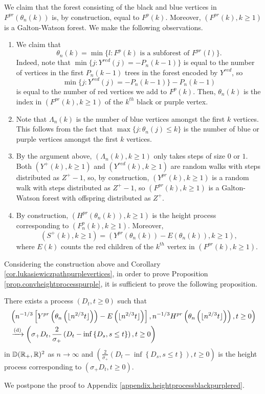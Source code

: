We claim that the forest consisting of the black and blue vertices in $F^{pr}(\theta_n(k))$ is, by construction, equal to $F^{p}(k)$. Moreover, $(F^{pr}(k),k\geq 1)$ is a Galton-Watson forest. We make the following observations.
\begin{enumerate}
    \item We claim that $$\theta_n(k)=\min\{l: F^p(k)\text{ is a subforest of }F^{pr}(l)\}.$$ Indeed, note that $\min\{j: Y^{red}(j)=-P_n(k-1)\}$ is equal to the number of vertices in the first $P_n(k-1)$ trees in the forest encoded by $Y^{red}$, so $$\min\{j: Y^{red}(j)=-P_n(k-1)\}-P_n(k-1)$$ is equal to the number of red vertices we add to $F^p(k)$. Then, $\theta_n(k)$ is the index in $(F^{pr}(k),k\geq 1)$ of the $k^{th}$ black or purple vertex. 
    \item Note that $\Lambda_n(k)$ is the number of blue vertices amongst the first $k$ vertices. This follows from the fact that $\max\{j:\theta_n(j)\leq k\}$ is the number of blue or purple vertices amongst the first $k$ vertices. 
    \item By the argument above, $(\Lambda_n(k),k\geq 1)$ only takes steps of size $0$ or $1$. Both $(Y^+(k),k\geq 1)$ and $(Y^{red}(k),k\geq 1)$ are random walks with steps distributed as $Z^+-1$, so, by construction, $(Y^{pr}(k),k\geq 1)$ is a random walk with steps distributed as $Z^+-1$, so $(F^{pr}(k),k\geq 1)$ is a Galton-Watson forest with offspring distributed as $Z^+$.
    \item By construction, $(H^{pr}(\theta_n(k)),k\geq 1)$ is the height process corresponding to $(F^p_n(k),k\geq 1)$. Moreover,
   \begin{equation}\label{eq.constructionSp}(S^{+}(k),k\geq 1)=(Y^{pr}(\theta_n(k))-E(\theta_n(k)),k\geq 1),\end{equation}
    where 
    $E(k)$ counts the red children of the $k^{th}$ vertex in $(F^{pr}(k),k\geq 1)$.
\end{enumerate}
Considering the construction above and Corollary \ref{cor.lukasiewiczpathpurplevertices}, in order to prove Proposition \ref{prop.convheightprocesspurple}, it is sufficient to prove the following proposition.
\begin{proposition}\label{prop.heightprocessblackpurplered}
There exists a process $(D_t,t\geq 0)$ such that 
\begin{align*}
    &\left(n^{-1/3}\left[Y^{pr}\left(\theta_n\left(\lfloor n^{2/3}t\rfloor \right)\right)-E\left(\lfloor n^{2/3}t\rfloor \right)\right], n^{-1/3}H^{pr}\left(\theta_n\left(\lfloor n^{2/3}t\rfloor \right)\right),t\geq 0\right)\\
    &\xrightarrow[]{\mathrm{(d)}}\left(\sigma_+D_t,\frac{2}{\sigma_+}\left(D_t-\inf\left\{D_s,s\leq t\right\}\right),t\geq 0\right)
\end{align*}
in ${\mathbb D}({\mathbb R}_+,{\mathbb R})^2$ as $n\to \infty$ and $\left(\frac{2}{\sigma_+}\left(D_t-\inf\left\{D_s,s\leq t\right\}\right),t\geq 0\right)$ is the height process corresponding to $(\sigma_+D_t,t\geq 0)$.
\end{proposition} 
We postpone the proof to Appendix \ref{appendix.heightprocessblackpurplered}. 


